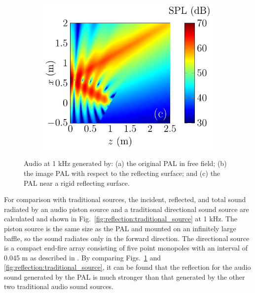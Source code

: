\begin{figure}[H]
\begin{subfigure}{0.32\textwidth}
    \end{subfigure}
    \begin{subfigure}{0.32\textwidth}
        \centering
        \includegraphics[width = \textwidth]{fig/ComputePalReflectionTruncated_Ultra60000_LocSurface1m_Total_211013C.pdf}
    \end{subfigure}
    \caption{Audio  at 1 kHz generated by: (a) the original PAL in free field; (b) the image PAL with respect to the reflecting surface; and (c) the PAL near a rigid reflecting surface.}
    \label{fig:reflection0}
\end{figure}

For comparison with traditional sources, the incident, reflected, and total sound radiated by an audio piston source and a traditional directional sound source are calculated and shown in Fig.~\ref{fig:reflection:traditional_source} at 1 kHz. 
The piston source is the same size as the PAL and mounted on an infinitely large baffle, so the sound radiates only in the forward direction. 
The directional source is a compact end-fire array consisting of five point monopoles with an interval of 0.045 m as described in \cite{Tu2016RobustnessCompactEndfire}. 
By comparing Figs.~\ref{fig:reflection0} and \ref{fig:reflection:traditional_source}, it can be found that the reflection for the audio sound generated by the PAL is much stronger than that generated by the other two traditional audio sound sources.

